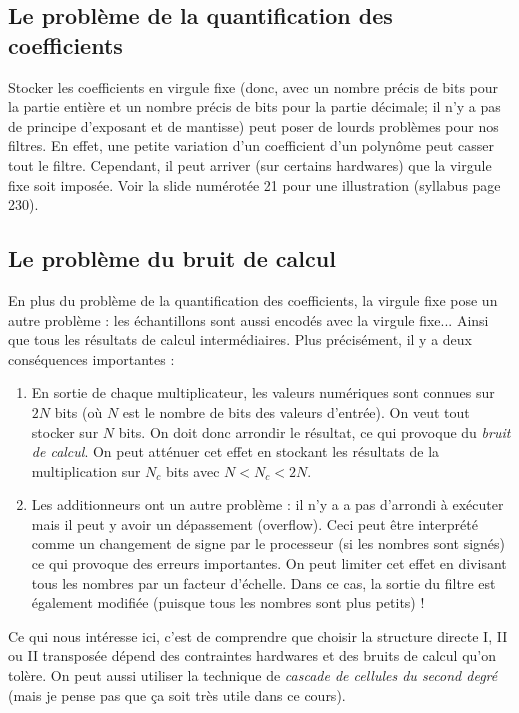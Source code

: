         \subsection{Le problème de la quantification des coefficients}
            Stocker les coefficients en virgule fixe (donc, avec un nombre précis de bits pour la partie entière et un nombre précis de bits pour la partie décimale; il n'y a pas de principe d'exposant et de mantisse) peut poser de lourds problèmes pour nos filtres. En effet, une petite variation d'un coefficient d'un polynôme peut casser tout le filtre. Cependant, il peut arriver (sur certains hardwares) que la virgule fixe soit imposée. Voir la slide numérotée 21 pour une illustration (syllabus page 230).

        \subsection{Le problème du bruit de calcul}
            En plus du problème de la quantification des coefficients, la virgule fixe pose un autre problème : les échantillons sont aussi encodés avec la virgule fixe... Ainsi que tous les résultats de calcul intermédiaires. Plus précisément, il y a deux conséquences importantes :
            \begin{enumerate}
                \item En sortie de chaque multiplicateur, les valeurs numériques sont connues sur $2N$ bits (où $N$ est le nombre de bits des valeurs d'entrée). On veut tout stocker sur $N$ bits. On doit donc arrondir le résultat, ce qui provoque du \textit{bruit de calcul}. On peut atténuer cet effet en stockant les résultats de la multiplication sur $N_c$ bits avec $N < N_c < 2N$.
                \item Les additionneurs ont un autre problème : il n'y a a pas d'arrondi à exécuter mais il peut y avoir un dépassement (overflow). Ceci peut être interprété comme un changement de signe par le processeur (si les nombres sont signés) ce qui provoque des erreurs importantes. On peut limiter cet effet en divisant tous les nombres par un facteur d'échelle. Dans ce cas, la sortie du filtre est également modifiée (puisque tous les nombres sont plus petits) !
            \end{enumerate}

            Ce qui nous intéresse ici, c'est de comprendre que choisir la structure directe I, II ou II transposée dépend des contraintes hardwares et des bruits de calcul qu'on tolère. On peut aussi utiliser la technique de \textit{cascade de cellules du second degré} (mais je pense pas que ça soit très utile dans ce cours).

